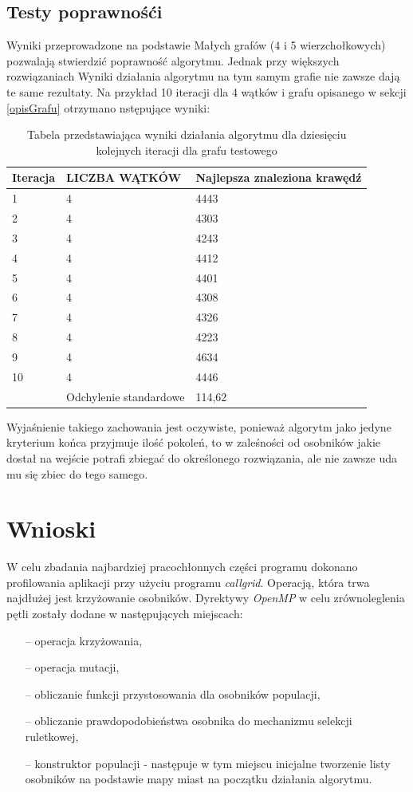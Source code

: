\documentclass[10pt,a4paper]{article}
\begin{document}
\subsection{Testy poprawnośći}
Wyniki przeprowadzone na podstawie Małych grafów (4 i 5 wierzchołkowych) pozwalają stwierdzić poprawność algorytmu. 
Jednak przy większych rozwiązaniach Wyniki działania algorytmu na tym samym grafie nie zawsze dają te same rezultaty.  
Na przykład 10 iteracji dla 4 wątków i grafu opisanego w sekcji \ref{opisGrafu} otrzymano nstępujące wyniki:
 
 \begin{table}[H]
 \begin{tabular}{|p{2cm}|p{2cm}|p{4cm}|}
 \hline
 Iteracja & LICZBA  WĄTKÓW & Najlepsza znaleziona krawędź\\\hline
1 & 4 & 4443\\\hline
2 & 4 & 4303\\\hline
3 & 4 & 4243\\\hline
4 & 4 & 4412\\\hline
5 & 4 & 4401\\\hline
6 & 4 & 4308\\\hline
7 & 4 & 4326\\\hline
8 & 4 & 4223\\\hline
9 & 4 & 4634\\\hline
10 & 4 & 4446\\\hline
& Odchylenie standardowe & 114,62\\\hline
 
 \end{tabular}
 \caption{Tabela przedstawiająca wyniki działania algorytmu dla dziesięciu kolejnych iteracji dla grafu testowego}
 \end{table}
 
 Wyjaśnienie takiego zachowania jest oczywiste, ponieważ algorytm jako jedyne kryterium końca przyjmuje ilość pokoleń, to w zaleśności od osobników jakie dostał na wejście potrafi zbiegać do określonego rozwiązania, ale nie zawsze uda mu się zbiec do tego samego.
\section{Wnioski}
W celu zbadania najbardziej pracochłonnych części programu dokonano profilowania aplikacji przy użyciu programu \textit{callgrid}. Operacją, która trwa najdłużej jest krzyżowanie osobników. Dyrektywy \textit{OpenMP} w celu zrównoleglenia pętli zostały dodane w następujących miejscach:
\begin{itemize}
\item[--] operacja krzyżowania,
\item[--] operacja mutacji,
\item[--] obliczanie funkcji przystosowania dla osobników populacji,
\item[--] obliczanie prawdopodobieństwa osobnika do mechanizmu selekcji ruletkowej,
\item[--] konstruktor populacji - następuje w tym miejscu inicjalne tworzenie listy osobników na podstawie mapy miast na początku działania algorytmu.
\end{itemize}
\end{document}
